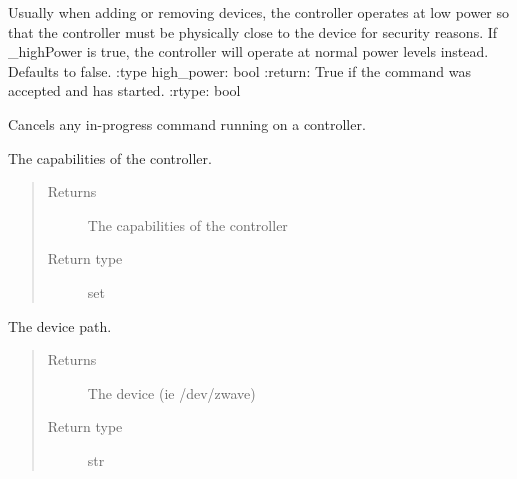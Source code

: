 \documentclass[letterpaper,10pt,english]{sphinxmanual}
\begin{document}
\begin{fulllineitems}
\begin{fulllineitems}
Usually when adding or removing devices, the controller operates at low power so that the controller must
be physically close to the device for security reasons.  If \_highPower is true, the controller will
operate at normal power levels instead.  Defaults to false.
:type high\_power: bool
:return: True if the command was accepted and has started.
:rtype: bool

\end{fulllineitems}


\begin{fulllineitems}
\label{controller:openzwave.controller.ZWaveController.cancel_command}
Cancels any in-progress command running on a controller.

\end{fulllineitems}


\begin{fulllineitems}
\label{controller:openzwave.controller.ZWaveController.capabilities}
The capabilities of the controller.
\begin{quote}\begin{description}
\item[{Returns}] \leavevmode
The capabilities of the controller

\item[{Return type}] \leavevmode
set

\end{description}\end{quote}

\end{fulllineitems}


\begin{fulllineitems}
\label{controller:openzwave.controller.ZWaveController.device}
The device path.
\begin{quote}\begin{description}
\item[{Returns}] \leavevmode
The device (ie /dev/zwave)

\item[{Return type}] \leavevmode
str


\end{description}
\end{quote}
\end{fulllineitems}
\end{fulllineitems}
\end{document}
